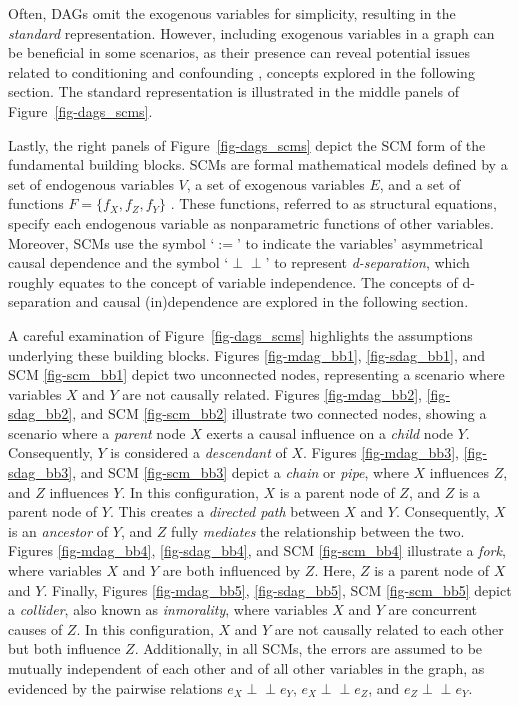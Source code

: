 \documentclass[
  authoryear,
  preprint,
  1p]{elsarticle}
\begin{document}
Often, DAGs omit the exogenous variables for simplicity, resulting in
the \emph{standard} representation. However, including exogenous
variables in a graph can be beneficial in some scenarios, as their
presence can reveal potential issues related to conditioning and
confounding \citep{Cinelli_et_al_2020}, concepts explored in the
following section. The standard representation is illustrated in the
middle panels of Figure~\ref{fig-dags_scms}.

Lastly, the right panels of Figure~\ref{fig-dags_scms} depict the SCM
form of the fundamental building blocks. SCMs are formal mathematical
models defined by a set of endogenous variables \(V\), a set of
exogenous variables \(E\), and a set of functions
\(F=\{f_{X},f_{Z},f_{Y}\}\) \citep{Pearl_2009, Neal_2020}. These
functions, referred to as structural equations, specify each endogenous
variable as nonparametric functions of other variables. Moreover, SCMs
use the symbol `\(:=\)' to indicate the variables' asymmetrical causal
dependence and the symbol `\(\perp\!\!\!\perp\)' to represent
\emph{d-separation}, which roughly equates to the concept of variable
independence. The concepts of d-separation and causal (in)dependence are
explored in the following section.

A careful examination of Figure~\ref{fig-dags_scms} highlights the
assumptions underlying these building blocks. Figures
\ref{fig-mdag_bb1}, \ref{fig-sdag_bb1}, and SCM \ref{fig-scm_bb1} depict
two unconnected nodes, representing a scenario where variables \(X\) and
\(Y\) are not causally related. Figures \ref{fig-mdag_bb2},
\ref{fig-sdag_bb2}, and SCM \ref{fig-scm_bb2} illustrate two connected
nodes, showing a scenario where a \emph{parent} node \(X\) exerts a
causal influence on a \emph{child} node \(Y\). Consequently, \(Y\) is
considered a \emph{descendant} of \(X\). Figures \ref{fig-mdag_bb3},
\ref{fig-sdag_bb3}, and SCM \ref{fig-scm_bb3} depict a \emph{chain} or
\emph{pipe}, where \(X\) influences \(Z\), and \(Z\) influences \(Y\).
In this configuration, \(X\) is a parent node of \(Z\), and \(Z\) is a
parent node of \(Y\). This creates a \emph{directed path} between \(X\)
and \(Y\). Consequently, \(X\) is an \emph{ancestor} of \(Y\), and \(Z\)
fully \emph{mediates} the relationship between the two. Figures
\ref{fig-mdag_bb4}, \ref{fig-sdag_bb4}, and SCM \ref{fig-scm_bb4}
illustrate a \emph{fork}, where variables \(X\) and \(Y\) are both
influenced by \(Z\). Here, \(Z\) is a parent node of \(X\) and \(Y\).
Finally, Figures \ref{fig-mdag_bb5}, \ref{fig-sdag_bb5}, SCM
\ref{fig-scm_bb5} depict a \emph{collider}, also known as
\emph{inmorality}, where variables \(X\) and \(Y\) are concurrent causes
of \(Z\). In this configuration, \(X\) and \(Y\) are not causally
related to each other but both influence \(Z\). Additionally, in all
SCMs, the errors are assumed to be mutually independent of each other
and of all other variables in the graph, as evidenced by the pairwise
relations \(e_{X} \perp\!\!\!\perp e_{Y}\),
\(e_{X} \perp\!\!\!\perp e_{Z}\), and \(e_{Z} \perp\!\!\!\perp e_{Y}\).
\end{document}

